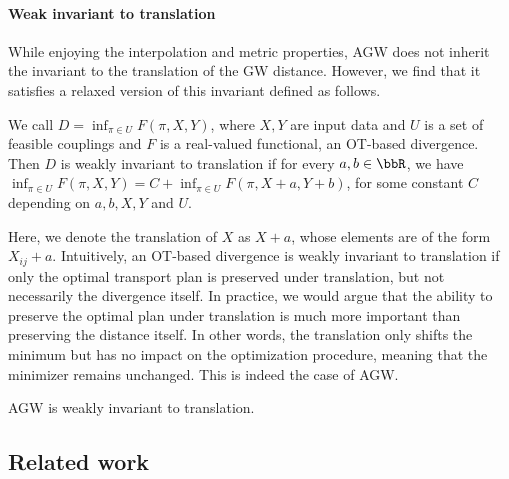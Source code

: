 \paragraph{Weak invariant to translation}
While enjoying the interpolation and metric properties, AGW does not inherit the invariant
to the translation of the GW distance. However, we find that it satisfies a relaxed version
of this invariant defined as follows.
\begin{definition}
    We call $D = \inf_{\pi \in U} F(\pi, X, Y)$, where $X, Y$ are input data and $U$
    is a set of feasible couplings and $F$ is a real-valued functional, an OT-based divergence.
    Then $D$ is weakly invariant to translation if for every $a, b \in \bbR$, we have
    $\inf_{\pi \in U} F(\pi, X, Y) = C + \inf_{\pi \in U} F(\pi, X + a, Y+b)$,
    for some constant $C$ depending on $a, b, X, Y$ and $U$.
\end{definition}
Here, we denote the translation of $X$ as $X + a$, whose elements are of the form $X_{ij} + a$.
Intuitively, an OT-based divergence is weakly invariant to translation if only
the optimal transport plan is preserved under translation, but not necessarily the divergence itself.
In practice, we would argue that the ability to preserve the optimal plan under translation
is much more important than preserving the distance itself. In other words,
the translation only shifts the minimum but has no impact on the optimization procedure,
meaning that the minimizer remains unchanged. This is indeed the case of AGW.
\begin{proposition}
    \label{prop:invariant}
    AGW is weakly invariant to translation.
\end{proposition}

\subsection{Related work}


